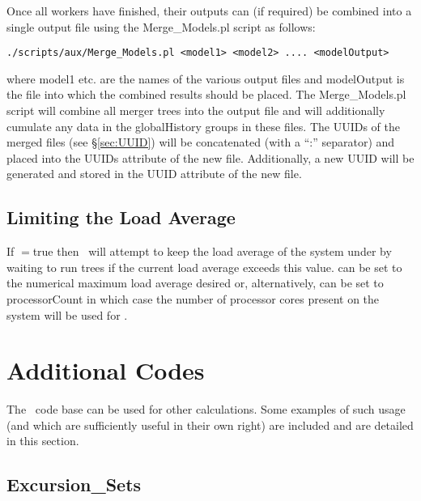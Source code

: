 Once all workers have finished, their outputs can (if required) be combined into a single output file using the {\normalfont \ttfamily Merge\_Models.pl} script as follows:
\begin{verbatim}
./scripts/aux/Merge_Models.pl <model1> <model2> .... <modelOutput>
\end{verbatim}
where {\normalfont \ttfamily model1} etc. are the names of the various output files and {\normalfont \ttfamily modelOutput} is the file into which the combined results should be placed. The {\normalfont \ttfamily Merge\_Models.pl} script will combine all merger trees into the output file and will additionally cumulate any data in the {\normalfont \ttfamily globalHistory} groups in these files. The UUIDs of the merged files (see \S\ref{sec:UUID}) will be concatenated (with a ``:'' separator) and placed into the {\normalfont \ttfamily UUIDs} attribute of the new file. Additionally, a new UUID will be generated and stored in the {\normalfont \ttfamily UUID} attribute of the new file.

\subsection{Limiting the Load Average}

If {\normalfont \ttfamily [treeEvolveLimitLoadAverage]}$=${\normalfont \ttfamily true} then \glc\ will attempt to keep the load average of the system under {\normalfont \ttfamily [treeEvolveLoadAverageMaximum]} by waiting to run trees if the current load average exceeds this value. {\normalfont \ttfamily [treeEvolveLoadAverageMaximum]} can be set to the numerical maximum load average desired or, alternatively, can be set to {\normalfont \ttfamily processorCount} in which case the number of processor cores present on the system will be used for {\normalfont \ttfamily [treeEvolveLoadAverageMaximum]}.

\section{Additional Codes}

The \glc\ code base can be used for other calculations. Some examples of such usage (and which are sufficiently useful in their own right) are included and are detailed in this section.

\subsection{{\normalfont \ttfamily Excursion\_Sets}}

